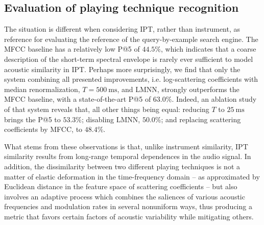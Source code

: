 \documentclass{article}
\makeatletter
\newcommand*{\ie}{i.e.\@\xspace}
\makeatother
\begin{document}
\subsection{Evaluation of playing technique recognition}

The situation is different when considering IPT, rather than instrument, as reference for evaluating the reference of the query-by-example search engine.
The MFCC baseline has a relatively low P@5 of $44.5\%$, which indicates that a coarse description of the short-term spectral envelope is rarely ever sufficient to model acoustic similarity in IPT.
Perhaps more surprisingly, we find that only the system combining all presented improvements, \ie{} log-scattering coefficients with median renormalization, $T=\SI{500}{\milli\second}$, and LMNN, strongly outperforms the MFCC baseline, with a state-of-the-art P@5 of $63.0\%$.
Indeed, an ablation study of that system reveals that, all other things being equal: reducing $T$ to $\SI{25}{\milli\second}$ brings the P@5 to $53.3\%$; disabling LMNN, $50.0\%$; and replacing scattering coefficients by MFCC, to $48.4\%$.

What stems from these observations is that, unlike instrument similarity, IPT similarity results from long-range temporal dependences in the audio signal.
In addition, the dissimilarity between two different playing techniques is not a matter of elastic deformation in the time-frequency domain -- as approximated by Euclidean distance in the feature space of scattering coefficients -- but also involves an adaptive process which combines the saliences of various acoustic frequencies and modulation rates in several nonuniform ways, thus producing a metric that favors certain factors of acoustic variability while mitigating others.


\end{document}
